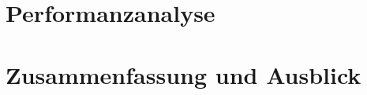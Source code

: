 \documentclass[course=asp]{aspdoc}
\begin{document}
\newpage
\section{Performanzanalyse}

\newpage
\section{Zusammenfassung und Ausblick}


{}
\end{document}
